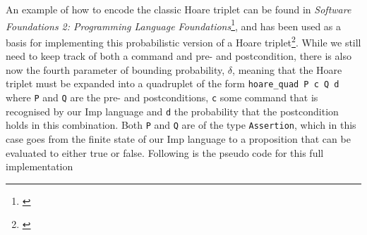
 



 \label{meatApp1Imp}
An example of how to encode the classic Hoare triplet can be found in \textit{Software Foundations 2: Programming Language Foundations}\footnote{\textcite{SF2}}, and has been used as a basis for implementing this probabilistic version of a Hoare triplet\footnote{\textcite{HoareSlides}}. While we still need to keep track of both a command and pre- and postcondition, there is also now the fourth parameter of bounding probability, $\delta$, meaning that the Hoare triplet must be expanded into a quadruplet of the form \texttt{hoare\_quad P c Q d} where \texttt{P} and \texttt{Q} are the pre- and postconditions, \texttt{c} some command that is recognised by our Imp language and \texttt{d} the probability that the postcondition holds in this combination. Both \texttt{P} and \texttt{Q} are of the type \texttt{Assertion}, which in this case goes from the finite state of our Imp language to a proposition that can be evaluated to either true or false. Following is the pseudo code for this full implementation

